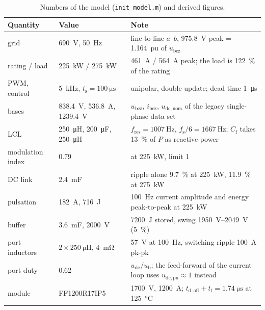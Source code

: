 \documentclass[11pt,a4paper]{scrartcl}
\newcommand{\ped}[1]{_{\mathrm{#1}}}
\newcommand{\code}[1]{\texttt{#1}}
\begin{document}
\begin{onehalfspace}
\begin{table}[H]
	\centering
	\captionsetup{width=0.9\textwidth, font=small}
	\caption[Numbers of the model.]{Numbers of the model (\code{init\_model.m}) and derived figures.}
	\label{tab:numbers}
	\begin{tabularx}{0.97\textwidth}{@{} l l X @{}}
		\toprule
		\textbf{Quantity} & \textbf{Value} & \textbf{Note} \\
		\midrule
		grid & \SI{690}{\volt}, \SI{50}{\hertz} & line-to-line $a$--$b$, \SI{975.8}{\volt} peak = \SI{1.164}{pu} of $u\ped{bez}$ \\
		rating / load & \SI{225}{\kilo\watt} / \SI{275}{\kilo\watt} & \SI{461}{\ampere} / \SI{564}{\ampere} peak; the load is \SI{122}{\percent} of the rating \\
		PWM, control & \SI{5}{\kilo\hertz}, $t\ped{s} = \SI{100}{\micro\second}$ & unipolar, double update; dead time \SI{1}{\micro\second} \\
		bases & \SI{838.4}{\volt}, \SI{536.8}{\ampere}, \SI{1239.4}{\volt} & $u\ped{bez}$, $i\ped{bez}$, $u\ped{dc,nom}$ of the legacy single-phase data set \\
		LCL & \SI{250}{\micro\henry}, \SI{200}{\micro\farad}, \SI{250}{\micro\henry} & $f\ped{res} = \SI{1007}{\hertz}$, $f\ped{s}/6 = \SI{1667}{\hertz}$; $C\ped{f}$ takes \SI{13}{\percent} of $P$ as reactive power \\
		modulation index & 0.79 & at \SI{225}{\kilo\watt}, limit 1 \\
		DC link & \SI{2.4}{\milli\farad} & ripple alone \SI{9.7}{\percent} at \SI{225}{\kilo\watt}, \SI{11.9}{\percent} at \SI{275}{\kilo\watt} \\
		pulsation & \SI{182}{\ampere}, \SI{716}{\joule} & \SI{100}{\hertz} current amplitude and energy peak-to-peak at \SI{225}{\kilo\watt} \\
		buffer & \SI{3.6}{\milli\farad}, \SI{2000}{\volt} & \SI{7200}{\joule} stored, swing \SIrange{1950}{2049}{\volt} (\SI{5}{\percent}) \\
		port inductors & $2 \times \SI{250}{\micro\henry}$, \SI{4}{\milli\ohm} & \SI{57}{\volt} at \SI{100}{\hertz}, switching ripple \SI{100}{\ampere} pk-pk \\
		port duty & 0.62 & $u\ped{dc}/u\ped{b}$; the feed-forward of the current loop uses $u\ped{dc,pu} \approx 1$ instead \\
		module & FF1200R17IP5 & \SI{1700}{\volt}, \SI{1200}{\ampere}; $t\ped{d,off} + t\ped{f} = \SI{1.74}{\micro\second}$ at \SI{125}{\celsius} \\
		\bottomrule
	\end{tabularx}
\end{table}


\end{onehalfspace}
\end{document}
